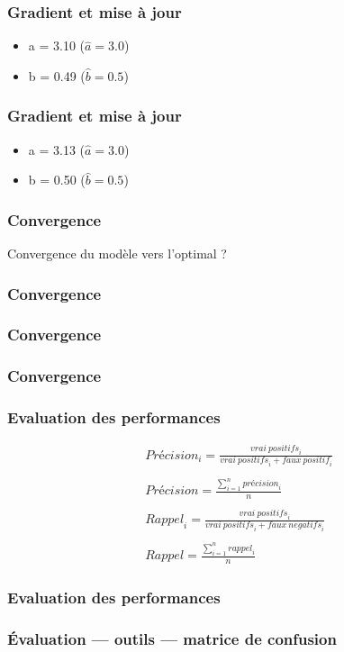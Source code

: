 \documentclass{formation}
\begin{document}
\begin{frame}
  \frametitle{Gradient et mise à jour}
  \begin{itemize}
  \item a = 3.10 ($\hat{a} = 3.0$)
  \item b = 0.49 ($\hat{b} = 0.5$)
  \end{itemize}
\end{frame}

\begin{frame}
  \frametitle{Gradient et mise à jour}
  \begin{itemize}
  \item a = 3.13 ($\hat{a} = 3.0$)
  \item b = 0.50 ($\hat{b} = 0.5$)
  \end{itemize}
\end{frame}

\begin{frame}
  \frametitle{Convergence}
  Convergence du modèle vers l'optimal ?
\end{frame}

\begin{frame}
  \frametitle{Convergence}
\end{frame}

\begin{frame}
  \frametitle{Convergence}
\end{frame}

\begin{frame}
  \frametitle{Convergence}
\end{frame}

\begin{frame}
  \frametitle{Evaluation des performances}
  \begin{align*}
    &\mathit{Précision}_i = \frac{\mathit{vrai\:positifs}_i}{\mathit{vrai\:positifs}_i+\mathit{faux\:positif}_i} \\
    &\\
    &\mathit{Précision} = \frac{\sum\limits_{i=1}^n \mathit{précision}_i}{n} \\
    &\\
    &\mathit{Rappel}_i = \frac{\mathit{vrai\:positifs}_i}{\mathit{vrai\:positifs}_i+\mathit{faux\:negatifs}_i} \\
    &\\
    &\mathit{Rappel} = \frac{\sum\limits_{i=1}^n \mathit{rappel}_i}{n}
  \end{align*}
\end{frame}

\begin{frame}
  \frametitle{Evaluation des performances}
\end{frame}

\begin{frame}
  \frametitle{Évaluation — outils — matrice de confusion}
\end{frame}
\end{document}
